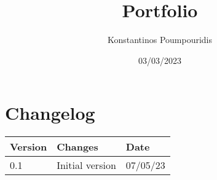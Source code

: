 \documentclass[12pt, letterpaper]{article}
\title{Portfolio}
\author{Konstantinos Poumpouridis}
\date{03/03/2023}
\begin{document}
\maketitle
\thispagestyle{empty}
\newpage
\section{Changelog}
    \begin{table}[htbp]
        \begin{tabular}{|l|l|l|}
            \hline
            Version & Changes         & Date   \tabularnewline \hline
            0.1     & Initial version & 07/05/23 \tabularnewline \hline
        \end{tabular}
    \end{table}
\newpage
\tableofcontents
\newpage
\end{document}
